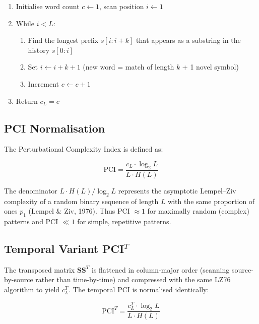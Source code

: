 \documentclass[11pt,a4paper]{article}
\begin{document}
\begin{tcolorbox}[title={Algorithm: LZ76 Exhaustive Parsing}, colback=codeGray, colframe=cBlue!70]
\begin{enumerate}[leftmargin=1.5em, itemsep=2pt]
  \item Initialise word count $c \leftarrow 1$, scan position $i \leftarrow 1$
  \item While $i < L$:
  \begin{enumerate}[label=\alph*., leftmargin=1.5em]
    \item Find the longest prefix $s[i{:}i{+}k]$ that appears as a substring in the
          history $s[0{:}i]$
    \item Set $i \leftarrow i + k + 1$ \quad (new word = match of length $k$ + 1 novel symbol)
    \item Increment $c \leftarrow c + 1$
  \end{enumerate}
  \item Return $c_L = c$
\end{enumerate}
\end{tcolorbox}

\subsection{PCI Normalisation}

The Perturbational Complexity Index is defined as:

\begin{equation}
  \boxed{\;
  \mathrm{PCI} = \frac{c_L \cdot \log_2 L}{L \cdot H(L)}
  \;}
  \label{eq:pci}
\end{equation}

The denominator $L \cdot H(L) / \log_2 L$ represents the asymptotic Lempel--Ziv complexity of
a random binary sequence of length $L$ with the same proportion of ones $p_1$ (Lempel \& Ziv,
1976). Thus PCI $\approx 1$ for maximally random (complex) patterns and PCI $\ll 1$ for simple,
repetitive patterns.

\subsection{Temporal Variant PCI$^T$}

The transposed matrix $\mathbf{SS}^T$ is flattened in column-major order (scanning
source-by-source rather than time-by-time) and compressed with the same LZ76 algorithm to
yield $c_L^T$. The temporal PCI is normalised identically:

\begin{equation}
  \mathrm{PCI}^T = \frac{c_L^T \cdot \log_2 L}{L \cdot H(L)}
  \label{eq:pcit}
\end{equation}
\end{document}
